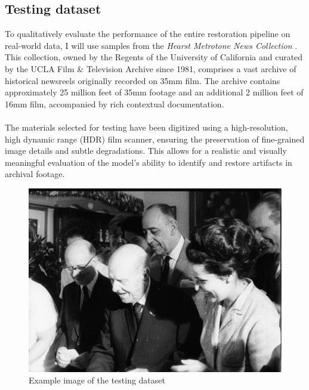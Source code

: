 \documentclass[openany, 12pt]{article}
\begin{document}
	\subsection{Testing dataset}
	To qualitatively evaluate the performance of the entire restoration pipeline on real-world data, I will use samples from the \textit{Hearst Metrotone News Collection} \cite{newsreel}. This collection, owned by the Regents of the University of California and curated by the UCLA Film \& Television Archive since 1981, comprises a vast archive of historical newsreels originally recorded on 35mm film. The archive contains approximately 25 million feet of 35mm footage and an additional 2 million feet of 16mm film, accompanied by rich contextual documentation.\\\\
	The materials selected for testing have been digitized using a high-resolution, high dynamic range (HDR) film scanner, ensuring the preservation of fine-grained image details and subtle degradations. This allows for a realistic and visually meaningful evaluation of the model's ability to identify and restore artifacts in archival footage.
	\begin{figure}[h!]
		\centering
		\includegraphics[width=0.5\linewidth]{images/news.png}
		\caption{\smaller Example image of the testing dataset} 
	\end{figure}
	
	\newpage
\end{document}
